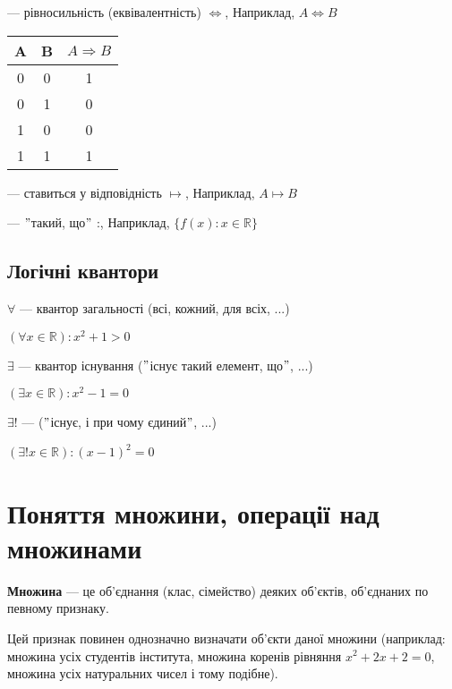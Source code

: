 --- рівносильність (еквівалентність) $\Leftrightarrow$, Наприклад, $A \Leftrightarrow B$

\begin{tabular}{c|c|c}
    A & B & $A \Rightarrow B$ \\
    \hline
    0 & 0 & 1 \\
    0 & 1 & 0 \\
    1 & 0 & 0 \\
    1 & 1 & 1 \\
\end{tabular}

--- ставиться у відповідність $\mapsto$, Наприклад, $A \mapsto B$

--- $"$такий, що$"$ :, Наприклад, $\{f(x): x \in \mathbb{R}\}$

\subsection*{Логічні квантори}

$\forall$ --- квантор загальності (всі, кожний, для всіх, ...)

\begin{example}
    $(\forall x \in \mathbb{R}): x^2 + 1 > 0$
\end{example}

$\exists$ --- квантор існування ($"$існує такий елемент, що$"$, ...)

\begin{example}
    $(\exists x \in \mathbb{R}): x^2 - 1 = 0$
\end{example}

$\exists!$ --- ($"$існує, і при чому єдиний$"$, ...)

\begin{example}
    $(\exists! x \in \mathbb{R}): (x - 1)^2 = 0$
\end{example}

\section{Поняття множини, операції над множинами}

\begin{definition}
    \textbf{Множина} --- це об'єднання (клас, сімейство) деяких об'єктів,
    об'єднаних по певному признаку.
\end{definition}

Цей признак повинен однозначно визначати об'єкти даної множини (наприклад:
множина усіх студентів інститута, множина коренів рівняння $x^2 + 2x + 2 = 0$,
множина усіх натуральних чисел і тому подібне).


